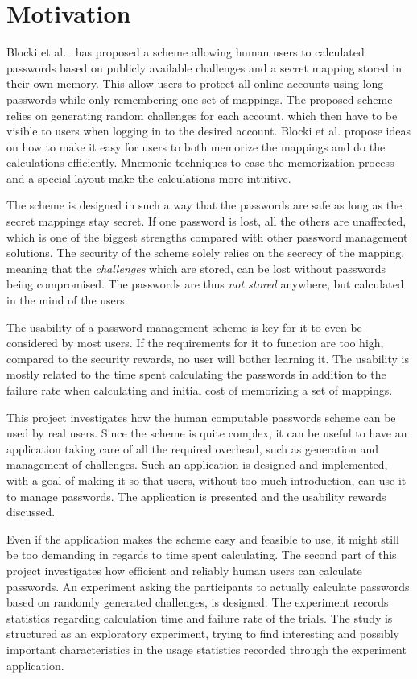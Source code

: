 \section{Motivation}
Blocki et al.~\cite{Blocki2014,hcp-blocki} has proposed a scheme allowing human users to calculated passwords based on publicly available challenges and a secret mapping stored in their own memory. This allow users to protect all online accounts using long passwords while only remembering one set of mappings. The proposed scheme relies on generating random challenges for each account, which then have to be visible to users when logging in to the desired account. Blocki et al. propose ideas on how to make it easy for users to both memorize the mappings and do the calculations efficiently. Mnemonic techniques to ease the memorization process and a special layout make the calculations more intuitive.
\par The scheme is designed in such a way that the passwords are safe as long as the secret mappings stay secret. If one password is lost, all the others are unaffected, which is one of the biggest strengths compared with other password management solutions. The security of the scheme solely relies on the secrecy of the mapping, meaning that the \emph{challenges} which are stored, can be lost without passwords being compromised. The passwords are thus \emph{not stored} anywhere, but calculated in the mind of the users. 
\par The usability of a password management scheme is key for it to even be considered by most users. If the requirements for it to function are too high, compared to the security rewards, no user will bother learning it. The usability is mostly related to the time spent calculating the passwords in addition to the failure rate when calculating and initial cost of memorizing a set of mappings.
\par This project investigates how the human computable passwords scheme can be used by real users. Since the scheme is quite complex, it can be useful to have an application taking care of all the required overhead, such as generation and management of challenges. Such an application is designed and implemented, with a goal of making it so that users, without too much introduction, can use it to manage passwords. The application is presented and the usability rewards discussed.
\par Even if the application makes the scheme easy and feasible to use, it might still be too demanding in regards to time spent calculating. The second part of this project investigates how efficient and reliably human users can calculate passwords. An experiment asking the participants to actually calculate passwords based on randomly generated challenges, is designed. The experiment records statistics regarding calculation time and failure rate of the trials. The study is structured as an exploratory experiment, trying to find interesting and possibly important characteristics in the usage statistics recorded through the experiment application.

